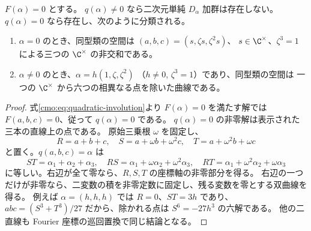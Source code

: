 \begin{corollary}[退化係数を含む存在条件]
\label{cmo:cor:two-dimensional-boundary}
$F(\alpha)=0$ とする。
$q(\alpha)\ne0$ なら二次元単純 $D_\alpha$ 加群は存在しない。
$q(\alpha)=0$ なら存在し、次のように分類される。
\begin{enumerate}
\item $\alpha=0$ のとき、同型類の空間は
$(a,b,c)=(s,\zeta s,\zeta^2s)$、
$s\in\C^\times$、$\zeta^3=1$ による三つの $\C^\times$ の非交和である。
\item $\alpha\ne0$ のとき、$\alpha=h(1,\zeta,\zeta^2)$
（$h\ne0$, $\zeta^3=1$）であり、同型類の空間は
一つの $\C^\times$ から六つの相異なる点を除いた曲線である。
\end{enumerate}
\end{corollary}

\begin{proof}
式\eqref{cmo:eq:quadratic-involution}より
$F(\alpha)=0$ を満たす解では $F(a,b,c)=0$、従って $q(\alpha)=0$ である。
$q(\alpha)=0$ の非零解は表示された三本の直線上の点である。
原始三乗根 $\omega$ を固定し、
\[
 R=a+b+c,\quad S=a+\omega b+\omega^2c,\quad
 T=a+\omega^2b+\omega c
\]
と置く。$q(a,b,c)=\alpha$ は
\[
 ST=\alpha_1+\alpha_2+\alpha_3,\quad
 RS=\alpha_1+\omega\alpha_2+\omega^2\alpha_3,\quad
 RT=\alpha_1+\omega^2\alpha_2+\omega\alpha_3
\]
に等しい。右辺が全て零なら、$R,S,T$ の座標軸の非零部分を得る。
右辺の一つだけが非零なら、二変数の積を非零定数に固定し、残る変数を零とする双曲線を得る。
例えば $\alpha=(h,h,h)$ では $R=0$、$ST=3h$ であり、
$abc=(S^3+T^3)/27$ だから、除かれる点は $S^6=-27h^3$ の六解である。
他の二直線も Fourier 座標の巡回置換で同じ結論となる。
\end{proof}

